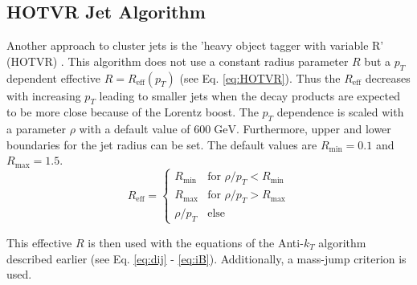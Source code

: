 \subsection{HOTVR Jet Algorithm}
	Another approach to cluster jets is the 'heavy object tagger with variable R' (HOTVR) \cite{hotvr}. This algorithm does not use a constant radius parameter $R$ but a $p_T$ dependent effective $R=R_\text{eff}(p_T)$ (see Eq. \ref{eq:HOTVR}). Thus the $R_\text{eff}$ decreases with increasing $p_T$ leading to smaller jets when the decay products are expected to be more close because of the Lorentz boost. The $p_T$ dependence is scaled with a parameter $\rho$ with a default value of $600\;\text{GeV}$. Furthermore, upper and lower boundaries for the jet radius can be set. The default values are $R_\text{min} = 0.1$ and $R_\text{max} = 1.5$. 	
	\begin{equation}
	\label{eq:HOTVR}
	  R_\text{eff} =
	   \begin{cases}
	     R_\text{min} & \text{for } \rho / p_T < R_\text{min} \\
	     R_\text{max} & \text{for } \rho / p_T > R_\text{max} \\
	     \rho / p_T & \text{else}  
	   \end{cases}
	\end{equation}
	
	\noindent This effective $R$ is then used with the equations of the Anti-$k_T$ algorithm described earlier (see Eq. \ref{eq:dij} - \ref{eq:iB}). Additionally, a mass-jump criterion is used.
	

